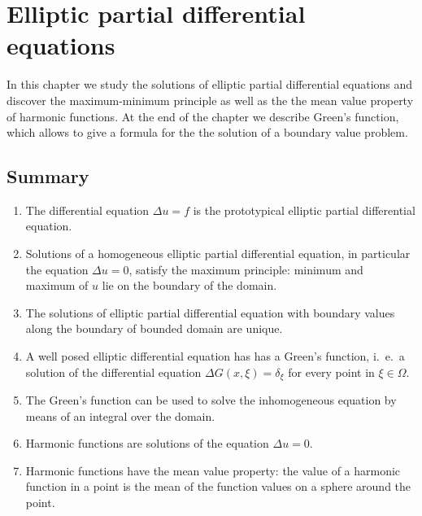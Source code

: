 %
%
%
\chapter{Elliptic partial differential equations\label{chapter-elliptisch}}
In this chapter we study the solutions of elliptic partial differential
equations and discover the maximum-minimum principle as well as the
the mean value property of harmonic functions.
At the end of the chapter we describe Green's function, which allows
to give a formula for the the solution of a boundary value problem.









\section{Summary}
\begin{enumerate}
\item
The differential equation $\Delta u=f$ is the prototypical elliptic
partial differential equation.
\item
Solutions of a homogeneous elliptic partial differential equation,
in particular the equation $\Delta u=0$, satisfy the maximum principle:
minimum and maximum of $u$ lie on the boundary of the domain.
\item
The solutions of elliptic partial differential equation with boundary
values along the boundary of bounded domain are unique.
\item
A well posed elliptic differential equation has  has a Green's function,
i.~e.~a solution of the differential equation
$\Delta G(x,\xi)=\delta_\xi$ for every point in $\xi\in\Omega$.
\item
The Green's function can be used to solve the inhomogeneous equation
by means of an integral over the domain.
\item
Harmonic functions are solutions of the equation $\Delta u=0$.
\item
Harmonic functions have the mean value property: the value of a harmonic
function in a point is the mean of the function values on a sphere around
the point.
\end{enumerate}


